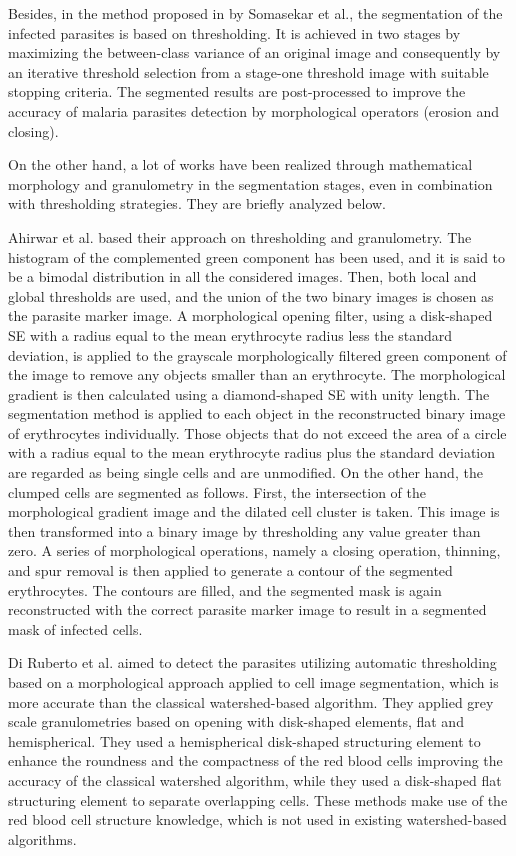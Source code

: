 \documentclass[final,a4paper,12pt,english]{UnicaPhdThesis3}
\begin{document}
Besides, in the method proposed in \cite{Somasekar2017} by Somasekar et al., the segmentation of the infected parasites is based on thresholding. It is achieved in two stages by maximizing the between-class variance of an original image and consequently by an iterative threshold selection from a stage-one threshold image with suitable stopping criteria. The segmented results are post-processed to improve the accuracy of malaria parasites detection by morphological operators (erosion and closing).

On the other hand, a lot of works have been realized through mathematical morphology and granulometry in the segmentation stages, even in combination with thresholding strategies. They are briefly analyzed below.

Ahirwar et al. \cite{Ahirwar2012} based their approach on thresholding and granulometry. The histogram of the complemented green component has been used, and it is said to be a bimodal distribution in all the considered images. Then, both local and global thresholds are used, and the union of the two binary images is chosen as the parasite marker image. A morphological opening filter, using a disk-shaped SE with a radius equal to the mean erythrocyte radius less the standard deviation, is applied to the grayscale morphologically filtered green component of the image to remove any objects smaller than an erythrocyte. The morphological gradient is then calculated using a diamond-shaped SE with unity length. The segmentation method is applied to each object in the reconstructed binary image of erythrocytes individually. Those objects that do not exceed the area of a circle with a radius equal to the mean erythrocyte radius plus the standard deviation are regarded as being single cells and are unmodified.
On the other hand, the clumped cells are segmented as follows. First, the intersection of the morphological gradient image and the dilated cell cluster is taken. This image is then transformed into a binary image by thresholding any value greater than zero. A series of morphological operations, namely a closing operation, thinning, and spur removal is then applied to generate a contour of the segmented erythrocytes. The contours are filled, and the segmented mask is again reconstructed with the correct parasite marker image to result in a segmented mask of infected cells.

Di Ruberto et al. \cite{DiRuberto2002} aimed to detect the parasites utilizing automatic thresholding based on a morphological approach applied to cell image segmentation, which is more accurate than the classical watershed-based algorithm. They applied grey scale granulometries based on opening with disk-shaped elements, flat and hemispherical. They used a hemispherical disk-shaped structuring element to enhance the roundness and the compactness of the red blood cells improving the accuracy of the classical watershed algorithm, while they used a disk-shaped flat structuring element to separate overlapping cells. These methods make use of the red blood cell structure knowledge, which is not used in existing watershed-based algorithms.
\end{document}
